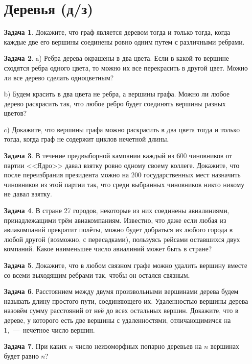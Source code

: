 \documentclass[12pt,a4paper,fleqn]{article}
\theoremstyle{definition}
\newtheorem{exersize}{Задача}[section]
\begin{document}
\section{Деревья (д/з)}
\begin{exersize}
	Докажите, что граф является деревом тогда и только тогда, когда каждые две его вершины соединены ровно одним путем с различными ребрами.
\end{exersize}	
\begin{exersize}
	a) Ребра дерева окрашены в два цвета. Если в какой-то вершине сходятся ребра одного цвета, то можно их все перекрасить в другой цвет. Можно ли все дерево сделать одноцветным?
	
	b) Будем красить в два цвета не ребра, а вершины графа. Можно ли любое дерево раскрасить так, что любое ребро будет соединять вершины разных цветов?
	
	c) Докажите, что вершины графа можно раскрасить в два цвета тогда и только тогда, когда граф не содержит циклов нечетной длины.
\end{exersize}	
\begin{exersize}
	В течение предвыборной кампании каждый из 600 чиновников от партии <<Ядро>> давал взятку ровно одному своему коллеге. Докажите, что после переизбрания президента можно на 200 государственных мест назначить чиновников из этой партии так, что среди выбранных чиновников никто никому не давал взятку.
\end{exersize}	
\begin{exersize}
	В стране 27 городов, некоторые из них соединены авиалиниями, принадлежащими трём авиакомпаниям. Известно, что даже если любая из авиакомпаний прекратит полёты, можно будет добраться из любого города в любой другой (возможно, с пересадками), пользуясь рейсами оставшихся двух компаний. Какое наименьшее число авиалиний может быть в стране?
\end{exersize}	
\begin{exersize}
	Докажите, что в любом связном графе можно удалить вершину вместе со всеми выходящим ребрами так, чтобы он остался связным.
\end{exersize}	
\begin{exersize}
	Расстоянием между двумя произвольными вершинами дерева будем называть длину простого пути, соединяющего их. Удаленностью вершины дерева назовём сумму расстояний от неё до всех остальных вершин. Докажите, что в дереве, у которого есть две вершины с удаленностями, отличающимичся на 1,~---~нечётное число вершин.
\end{exersize}	
\begin{exersize}
	При каких $n$ число неизоморфных попарно деревьев на $n$ вершинах будет равно $n$?
\end{exersize}
\end{document}

